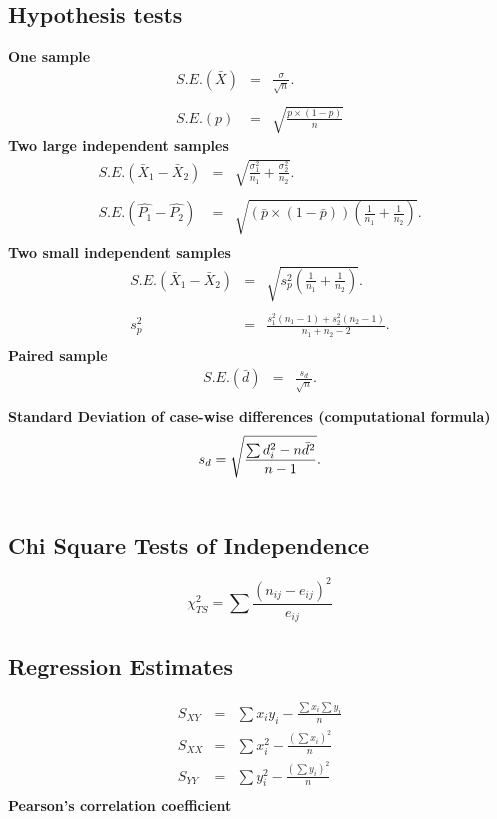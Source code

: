 \documentclass[a4paper,12pt]{article}
\begin{document}
\subsection*{Hypothesis tests}
{\bf One sample}
\begin{eqnarray*}
	S.E.(\bar{X})&=&\frac{\sigma}{\sqrt{n}}.\\\\
	S.E.(p)&=&\sqrt{\frac{p \times(1-p)}{n}}
\end{eqnarray*}
{\bf Two large independent samples}
\begin{eqnarray*}
	S.E.(\bar{X}_1-\bar{X}_2)&=&\sqrt{\frac{\sigma^2_1}{n_1}+\frac{\sigma_2^2}{n_2}}.\\\\
	S.E.(\hat{P_1}-\hat{P_2})&=&\sqrt{\left(\bar{p}\times(1-\bar{p})\right)\left(\frac{1}{n_1}+\frac{1}{n_2}\right)}.\\
\end{eqnarray*}
{\bf Two small independent samples}
\begin{eqnarray*}
	S.E.(\bar{X}_1-\bar{X}_2)&=&\sqrt{s_p^2\left(\frac{1}{n_1}+\frac{1}{n_2}\right)}.\\\\
	s_p^2&=&\frac{s_1^2(n_1-1)+s_2^2(n_2-1)}{n_1+n_2-2}.\\
\end{eqnarray*}
{\bf Paired sample}
\begin{eqnarray*}
	S.E.(\bar{d})&=&\frac{s_d}{\sqrt{n}}.\\\\
\end{eqnarray*}
{\bf Standard Deviation of case-wise differences (computational formula)}
\begin{eqnarray*}
	s_d = \sqrt{ {\sum d_i^2 - n\bar{d}^2 \over n-1}}.\\\\
\end{eqnarray*}
\subsection*{Chi Square Tests of Independence}
\[\chi^2_{TS} =  \sum \frac{(n_{ij} - e_{ij})^2}{e_{ij}}\]
\subsection*{Regression Estimates}
\begin{eqnarray*}
	S_{XY} &=&
	\sum x_iy_i - \frac{\sum x_i\sum y_i}{n}\\
	S_{XX} &=&
	\sum x_i^2 - \frac{(\sum x_i)^2}{n}\\
	S_{YY} &=&
	\sum y_i^2 - \frac{(\sum y_i)^2}{n}\\
\end{eqnarray*}
{\bf Pearson's correlation coefficient}
\end{document}
